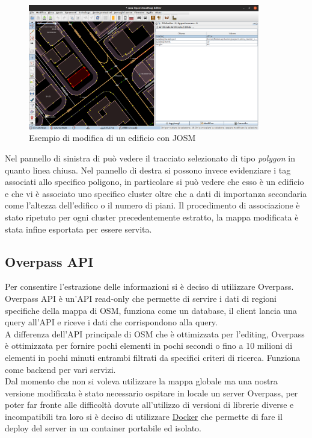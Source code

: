 \begin{figure}[H]
    \centering
    \includegraphics[width=0.9\textwidth]{Immagini/JOSMedit.png}
    \caption{Esempio di modifica di un edificio con JOSM}
    \label{fig:JOSMedit}
\end{figure}

Nel pannello di sinistra di può vedere il tracciato selezionato di tipo \textit{polygon} in quanto linea chiusa. 
Nel pannello di destra si possono invece evidenziare i tag associati allo specifico poligono, in particolare si può vedere che esso è un edificio e che vi è associato uno specifico cluster oltre che a dati di importanza secondaria come l'altezza dell'edifico o il numero di piani.
Il procedimento di associazione è stato ripetuto per ogni cluster precedentemente estratto, la mappa modificata è stata infine esportata per essere servita.

\subsection{Overpass API}
Per consentire l'estrazione delle informazioni si è deciso di utilizzare Overpass\cite{Overpass}.\\

Overpass API è un'API read-only che permette di servire i dati di regioni specifiche della mappa di OSM, funziona come un database, il client lancia una query all'API e riceve i dati che corrispondono alla query.\\

A differenza dell'API principale di OSM che è ottimizzata per l'editing, Overpass è ottimizzata per fornire pochi elementi in pochi secondi o fino a 10 milioni di elementi in pochi minuti entrambi filtrati da specifici criteri di ricerca. Funziona come backend per vari servizi.\\

Dal momento che non si voleva utilizzare la mappa globale ma una nostra versione modificata è stato necessario ospitare in locale un server Overpass, per poter far fronte alle difficoltà dovute all'utilizzo di versioni di librerie diverse e incompatibili tra loro si è deciso di utilizzare \hyperref[sez:Docker]{Docker} che permette di fare il deploy del server in un container portabile ed isolato.\\

